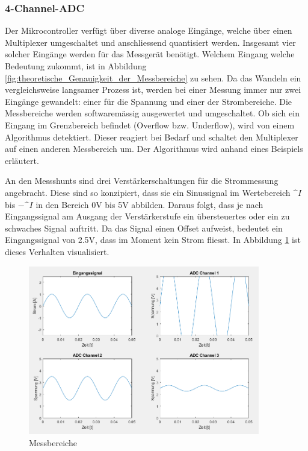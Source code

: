 \subsubsection*{4-Channel-ADC}
Der Mikrocontroller verfügt über diverse analoge Eingänge, welche über einen Multiplexer umgeschaltet und anschliessend quantisiert werden. Insgesamt vier solcher Eingänge werden für das Messgerät benötigt. Welchem Eingang welche Bedeutung zukommt, ist in Abbildung \ref{fig:theoretische_Genauigkeit_der_Messbereiche} zu sehen. Da das Wandeln ein vergleichsweise langsamer Prozess ist, werden bei einer Messung immer nur zwei Eingänge gewandelt: einer für die Spannung und einer der Strombereiche. Die Messbereiche werden softwaremässig ausgewertet und umgeschaltet. Ob sich ein Eingang im Grenzbereich befindet (Overflow bzw. Underflow), wird von einem Algorithmus detektiert. Dieser reagiert bei Bedarf und schaltet den Multiplexer auf einen anderen Messbereich um. Der Algorithmus wird anhand eines Beispiels erläutert.

An den Messshunts sind drei Verstärkerschaltungen für die Strommessung angebracht. Diese sind so konzipiert, dass sie ein Sinussignal im Wertebereich $\^{I}$ bis $-\^{I}$ in den Bereich 0V bis 5V abbilden. Daraus folgt, dass je nach Eingangssignal am Ausgang der Verstärkerstufe ein übersteuertes oder ein zu schwaches Signal auftritt. Da das Signal einen Offset aufweist, bedeutet ein Eingangssignal von 2.5V, dass im Moment kein Strom fliesst. In Abbildung \ref{fig:Software_messbereich} ist dieses Verhalten visualisiert.

\begin{figure}[H]
\begin{center}
\includegraphics[width=0.9\textwidth]{images/Software_messbereich.png}
\caption{Messbereiche}
\label{fig:Software_messbereich}
\end{center}
\end{figure}

